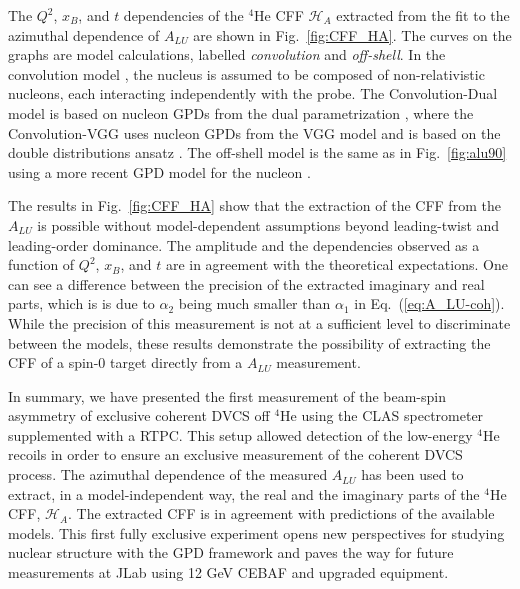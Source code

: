 \documentclass[twocolumn,nofootinbib,showpacs,prl,superscriptaddress,secnumarabic,amssymb,nobibnotes,aps,floatfix]{revtex4}
\begin{document}
The $Q^2$, $x_B$, and $t$ dependencies of the $^4$He CFF $\mathcal{H}_A$ 
extracted from the fit to the azimuthal dependence of $A_{LU}$ are shown in 
Fig.~\ref{fig:CFF_HA}. The curves on the graphs are model calculations, labelled 
{\it convolution} and {\it off-shell}. In the convolution model 
\cite{Vadim_priv}, the nucleus is assumed to be composed of non-relativistic 
nucleons, each interacting independently with the probe. The Convolution-Dual 
model is based on nucleon GPDs from the dual parametrization 
\cite{Guzey:2006xi}, where the Convolution-VGG uses nucleon GPDs  from the VGG 
model and is based on the double distributions ansatz \cite{DD_model}. The 
off-shell model is the same as in Fig.~\ref{fig:alu90} using a more recent
GPD model for the nucleon \cite{GonzalezHernandez:2012jv}.

The results in Fig.~\ref{fig:CFF_HA} show that the extraction of the CFF
from the $A_{LU}$ is possible without model-dependent assumptions beyond
leading-twist and leading-order dominance. The amplitude and the dependencies 
observed as a function of 
$Q^{2}$, $x_B$, and $t$ are in agreement with the theoretical expectations. One 
can see a difference between the precision of the extracted imaginary and real 
parts, which is is due to $\alpha_2$ being much smaller than $\alpha_1$ in
Eq.~(\ref{eq:A_LU-coh}). While the precision of this measurement is not at a
sufficient level to discriminate between the models, these results demonstrate
the possibility of extracting the CFF of a spin-0 target directly from a $A_{LU}$
measurement.


In summary, we have presented the first measurement of the beam-spin asymmetry
of exclusive coherent DVCS off $^4$He using the CLAS spectrometer supplemented 
with a RTPC. This setup allowed detection of the 
low-energy $^4$He recoils in order to ensure an exclusive measurement of the
coherent DVCS process. The azimuthal dependence of the measured $A_{LU}$ has 
been used to extract, in a model-independent way, the real and the imaginary 
parts of the $^4$He CFF, $\mathcal{H}_A$. The extracted CFF is in  
agreement with predictions of the available models. This first fully exclusive 
experiment opens new perspectives for studying nuclear structure with the GPD 
framework and paves the way for future measurements at JLab using 12 GeV CEBAF 
and upgraded equipment.
\end{document}
